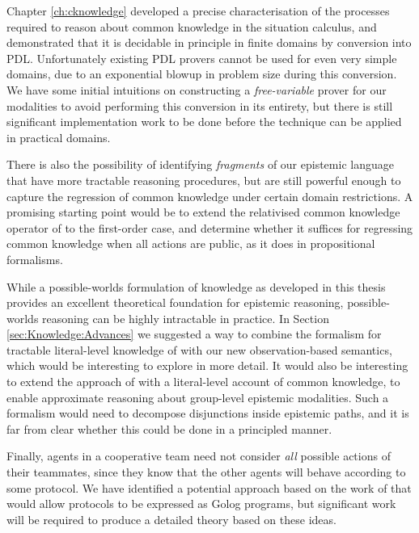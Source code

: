 Chapter \ref{ch:cknowledge} developed a precise characterisation
of the processes required to reason about common knowledge in the
situation calculus, and demonstrated that it is decidable in principle
in finite domains by conversion into PDL. Unfortunately existing PDL
provers cannot be used for even very simple domains, due to an exponential
blowup in problem size during this conversion. We have some initial
intuitions on constructing a \emph{free-variable} prover for our modalities
to avoid performing this conversion in its entirety, but there is
still significant implementation work to be done before the technique
can be applied in practical domains.

There is also the possibility of identifying \emph{fragments} of our
epistemic language that have more tractable reasoning procedures,
but are still powerful enough to capture the regression of common
knowledge under certain domain restrictions. A promising starting
point would be to extend the relativised common knowledge operator
of \citet{vanBenthem06lcc} to the first-order case, and determine
whether it suffices for regressing common knowledge when all actions
are public, as it does in propositional formalisms.

While a possible-worlds formulation of knowledge as developed in this
thesis provides an excellent theoretical foundation for epistemic
reasoning, possible-worlds reasoning can be highly intractable in
practice. In Section \ref{sec:Knowledge:Advances} we suggested a
way to combine the formalism for tractable literal-level knowledge
of \citep{demolombe00tractable_sc_belief} with our new observation-based
semantics, which would be interesting to explore in more detail. It
would also be interesting to extend the approach of \citep{demolombe00tractable_sc_belief}
with a literal-level account of common knowledge, to enable approximate
reasoning about group-level epistemic modalities. Such a formalism
would need to decompose disjunctions inside epistemic paths, and it
is far from clear whether this could be done in a principled manner.

Finally, agents in a cooperative team need not consider \emph{all}
possible actions of their teammates, since they know that the other
agents will behave according to some protocol. We have identified
a potential approach based on the work of \citep{fritz08congolog_sin_trans}
that would allow protocols to be expressed as Golog programs, but
significant work will be required to produce a detailed theory based
on these ideas.


